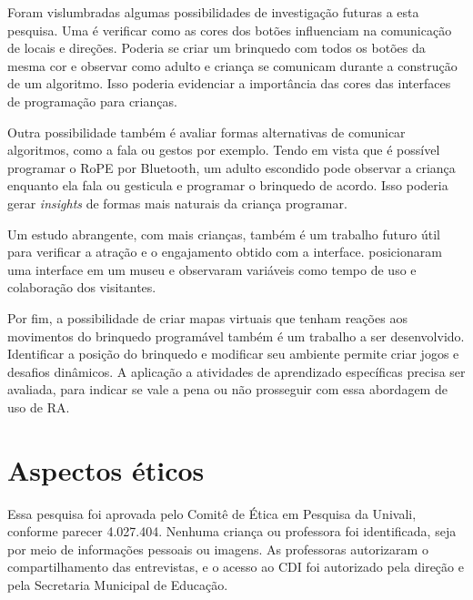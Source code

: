 
Foram vislumbradas algumas possibilidades de investigação futuras a esta pesquisa. Uma é verificar como as cores dos botões influenciam na comunicação de locais e direções. Poderia se criar um brinquedo com todos os botões da mesma cor e observar como adulto e criança se comunicam durante a construção de um algoritmo. Isso poderia evidenciar a importância das cores das interfaces de programação para crianças.

Outra possibilidade também é avaliar formas alternativas de comunicar algoritmos, como a fala ou gestos por exemplo. Tendo em vista que é possível programar o RoPE por Bluetooth, um adulto escondido pode observar a criança enquanto ela fala ou gesticula e programar o brinquedo de acordo. Isso poderia gerar \textit{insights} de formas mais naturais da criança programar.

Um estudo abrangente, com mais crianças, também é um trabalho futuro útil para verificar a atração e o engajamento obtido com a interface.  posicionaram uma interface em um museu e observaram variáveis como tempo de uso e colaboração dos visitantes.

Por fim, a possibilidade de criar mapas virtuais que tenham reações aos movimentos do brinquedo programável também é um trabalho a ser desenvolvido. Identificar a posição do brinquedo e modificar seu ambiente permite criar jogos e desafios dinâmicos. A aplicação a atividades de aprendizado específicas precisa ser avaliada, para indicar se vale a pena ou não prosseguir com essa abordagem de uso de \acl{RA}.

\section{Aspectos éticos}
Essa pesquisa foi aprovada pelo Comitê de Ética em Pesquisa da Univali, conforme parecer 4.027.404. Nenhuma criança ou professora foi identificada, seja por meio de informações pessoais ou imagens. As professoras autorizaram o compartilhamento das entrevistas, e o acesso ao CDI foi autorizado pela direção e pela Secretaria Municipal de Educação.